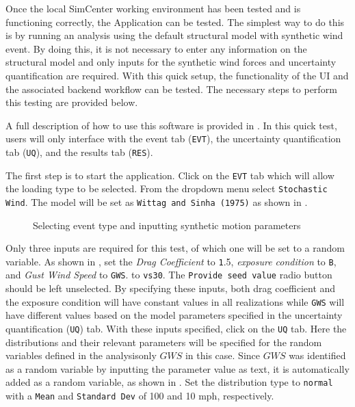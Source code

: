 Once the local SimCenter working environment has been tested and is
functioning correctly, the \texttt{\getsoftwarename{}} Application
can be tested. The simplest way to do this is by running an analysis
using the default structural model with synthetic wind event. By
doing this, it is not necessary to enter any information on the
structural model and only inputs for the synthetic wind forces 
and uncertainty quantification are required. With this quick setup, the
functionality of the \texttt{\getsoftwarename{}} UI and the associated backend
workflow can be tested. The necessary steps to perform this
testing are provided below.

A full description of how to use this software is provided
in .  In this quick test, users will only
interface with the event tab (\texttt{EVT}), the uncertainty
quantification tab (\texttt{UQ}), and the results tab (\texttt{RES}).

The first step is to start the \texttt{\getsoftwarename{}}
application. Click on the \texttt{EVT} tab which will allow 
the loading type to be selected. From the dropdown menu select 
\texttt{Stochastic Wind}. The model will be set as 
\texttt{Wittag and Sinha (1975)} as shown in .

\begin{figure}[!htbp]
  \caption{Selecting event type and inputting synthetic motion parameters}
  \label{fig:input_event}
\end{figure}

Only three inputs are required for this test, of which one will be set
to a random variable. As shown in , set the
\emph{Drag Coefficient} to {\texttt 1.5}, \emph{exposure condition} to \texttt{B}, and \emph{Gust Wind Speed} to \texttt{GWS}.
to \texttt{vs30}. The \texttt{Provide seed value} radio button should
be left unselected. By specifying these inputs, both drag coefficient and the
exposure condition will have constant values in all realizations while \texttt{GWS} will have different values based on the model parameters specified in the
uncertainty quantification (\texttt{UQ}) tab. With these inputs specified, click on the \texttt{UQ} tab. Here the distributions and their relevant parameters will be specified for the random variables defined in the analysis\textemdash only $GWS$
in this case. Since $GWS$ was identified as a random variable
by inputting the parameter value as text, it is automatically added as
a random variable, as shown in . Set the
distribution type to \texttt{normal} with a \texttt{Mean}
and \texttt{Standard Dev} of 100 and 10 mph,
respectively.

